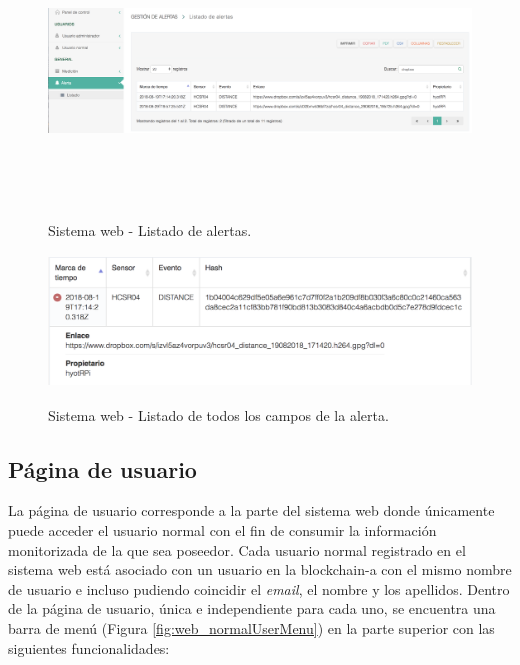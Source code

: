 \documentclass[12pt,a4paper, twoside]{report}
\begin{document}
		\begin{figure}[!ht]   
			\caption{Sistema web - Listado de alertas.} 
			\begin{center}
	 			\includegraphics[width=18cm, height=7cm]{Images/userGuide/web/alerts} \\
	 			\label{fig:web_alerts} 
			\end{center}  	
		\end{figure}
		
		\begin{figure}[!ht]   
			\caption{Sistema web - Listado de todos los campos de la alerta.} 
			\begin{center}
	 			\includegraphics[width=14cm, height=3.5cm]{Images/userGuide/web/alertFull} \\
	 			\label{fig:web_alertFull} 
			\end{center}  	
		\end{figure}
	
	\subsection{Página de usuario}
	
	La página de usuario corresponde a la parte del sistema web donde únicamente puede acceder el usuario normal con el fin de consumir la información monitorizada de la que sea poseedor. Cada usuario normal registrado en el sistema web está asociado con un usuario en la \gls{blockchain-a} con el mismo nombre de usuario e incluso pudiendo coincidir el \textit{email}, el nombre y los apellidos. Dentro de la página de usuario, única e independiente para cada uno, se encuentra una barra de menú (Figura \ref{fig:web_normalUserMenu}) en la parte superior con las siguientes funcionalidades:
	
\end{document}
